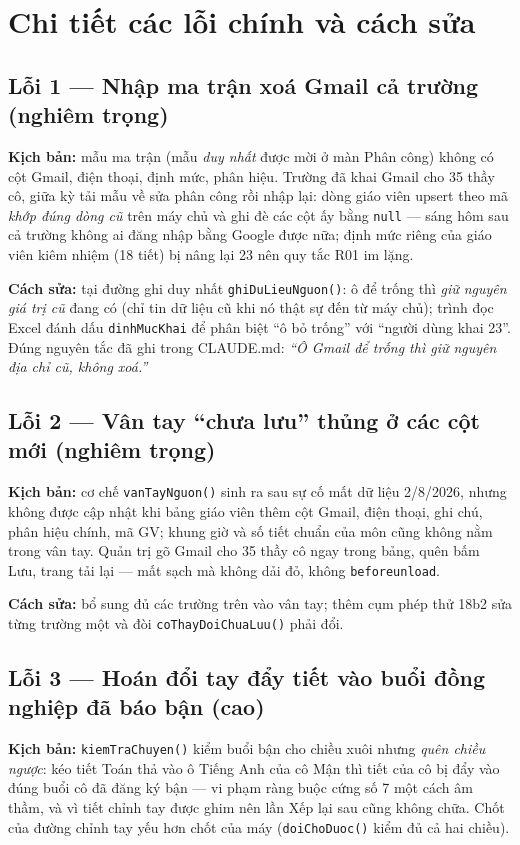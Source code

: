 \documentclass[12pt,a4paper]{article}
\newcommand{\muc}[1]{\textbf{#1}}
\begin{document}
\section{Chi tiết các lỗi chính và cách sửa}

\subsection*{Lỗi 1 --- Nhập ma trận xoá Gmail cả trường (nghiêm trọng)}
\muc{Kịch bản:} mẫu ma trận (mẫu \emph{duy nhất} được mời ở màn Phân công) không
có cột Gmail, điện thoại, định mức, phân hiệu. Trường đã khai Gmail cho 35 thầy
cô, giữa kỳ tải mẫu về sửa phân công rồi nhập lại: dòng giáo viên upsert theo mã
\emph{khớp đúng dòng cũ} trên máy chủ và ghi đè các cột ấy bằng \texttt{null} ---
sáng hôm sau cả trường không ai đăng nhập bằng Google được nữa; định mức riêng
của giáo viên kiêm nhiệm (18 tiết) bị nâng lại 23 nên quy tắc R01 im lặng.

\muc{Cách sửa:} tại đường ghi duy nhất \texttt{ghiDuLieuNguon()}: ô để trống thì
\emph{giữ nguyên giá trị cũ} đang có (chỉ tin dữ liệu cũ khi nó thật sự đến từ
máy chủ); trình đọc Excel đánh dấu \texttt{dinhMucKhai} để phân biệt ``ô bỏ
trống'' với ``người dùng khai 23''. Đúng nguyên tắc đã ghi trong CLAUDE.md:
\emph{``Ô Gmail để trống thì giữ nguyên địa chỉ cũ, không xoá.''}

\subsection*{Lỗi 2 --- Vân tay ``chưa lưu'' thủng ở các cột mới (nghiêm trọng)}
\muc{Kịch bản:} cơ chế \texttt{vanTayNguon()} sinh ra sau sự cố mất dữ liệu
2/8/2026, nhưng không được cập nhật khi bảng giáo viên thêm cột Gmail, điện
thoại, ghi chú, phân hiệu chính, mã GV; khung giờ và số tiết chuẩn của môn cũng
không nằm trong vân tay. Quản trị gõ Gmail cho 35 thầy cô ngay trong bảng, quên
bấm Lưu, trang tải lại --- mất sạch mà không dải đỏ, không \texttt{beforeunload}.

\muc{Cách sửa:} bổ sung đủ các trường trên vào vân tay; thêm cụm phép thử 18b2
sửa từng trường một và đòi \texttt{coThayDoiChuaLuu()} phải đổi.

\subsection*{Lỗi 3 --- Hoán đổi tay đẩy tiết vào buổi đồng nghiệp đã báo bận (cao)}
\muc{Kịch bản:} \texttt{kiemTraChuyen()} kiểm buổi bận cho chiều xuôi nhưng
\emph{quên chiều ngược}: kéo tiết Toán thả vào ô Tiếng Anh của cô Mận thì tiết
của cô bị đẩy vào đúng buổi cô đã đăng ký bận --- vi phạm ràng buộc cứng số 7
một cách âm thầm, và vì tiết chỉnh tay được ghim nên lần Xếp lại sau cũng không
chữa. Chốt của đường chỉnh tay yếu hơn chốt của máy (\texttt{doiChoDuoc()} kiểm
đủ cả hai chiều).
\end{document}
